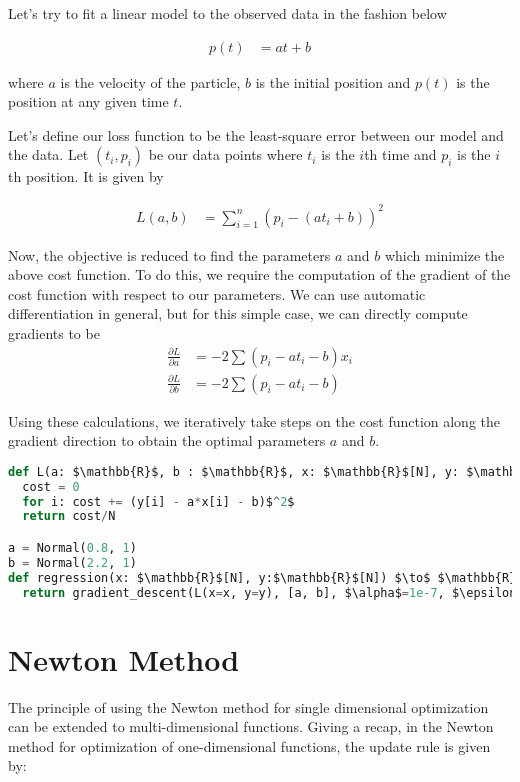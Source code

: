 \documentclass[book.tex]{subfiles}
\begin{document}
Let's try to fit a linear model to the observed data in the fashion below

\begin{align}
p(t) &= at + b
\end{align}

where $a$ is the velocity of the particle, $b$ is the initial position and $p(t)$ is the position at any given time $t$.

Let's define our loss function to be the least-square error between our model and the data. Let $(t_i,p_i)$ be our data points where $t_i$ is the $i$th time and $p_i$ is the $i$th position. It is given by

\begin{align}
L(a,b) &= \sum_{i=1}^{n}(p_i-(at_i+b))^2
\end{align}

Now, the objective is reduced to find the parameters $a$ and $b$ which minimize the above cost function. To do this, we require the computation of the gradient of the cost function with respect to our parameters. We can use automatic differentiation in general, but for this simple case, we can directly compute gradients to be
\begin{align}
\frac{\partial L}{\partial a} &= -2\sum(p_i-at_i-b)x_i\\
\frac{\partial L}{\partial b} &= -2\sum(p_i-at_i-b)
\end{align}

Using these calculations, we iteratively take steps on the cost function along the gradient direction to obtain the optimal parameters $a$ and $b$.

\begin{lstlisting}[language=python]
def L(a: $\mathbb{R}$, b : $\mathbb{R}$, x: $\mathbb{R}$[N], y: $\mathbb{R}$[N]) $\to$ $\mathbb{R}$:
  cost = 0
  for i: cost += (y[i] - a*x[i] - b)$^2$
  return cost/N

a = Normal(0.8, 1)
b = Normal(2.2, 1)
def regression(x: $\mathbb{R}$[N], y:$\mathbb{R}$[N]) $\to$ $\mathbb{R}$:	
  return gradient_descent(L(x=x, y=y), [a, b], $\alpha$=1e-7, $\epsilon$=1e-8)
\end{lstlisting}


\section{Newton Method}

The principle of using the Newton method for single dimensional optimization can be extended to multi-dimensional functions.  Giving a recap, in the Newton method for optimization of one-dimensional functions, the update rule is given by:
	
\end{document}
